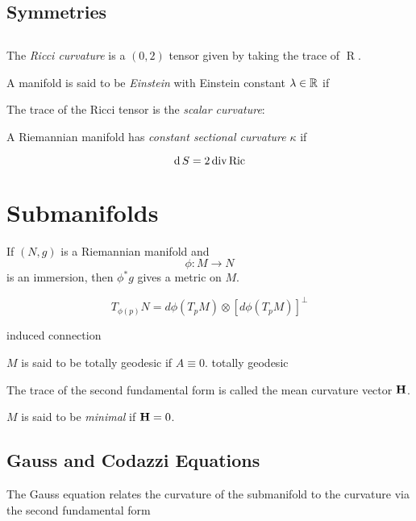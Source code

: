 \subsection{Symmetries}


\subsection{}
The \textit{Ricci curvature} is a $(0,2)$ tensor given by taking the trace of $\operatorname{R}$.
\begin{definition}
    
\end{definition}
A manifold is said to be \textit{Einstein} with Einstein constant $\lambda\in\mathbb{R}$ if 

The trace of the Ricci tensor is the \textit{scalar curvature}:
\begin{definition}
    
\end{definition}

\begin{definition}
    
\end{definition}
A Riemannian manifold has \textit{constant sectional curvature} $\kappa$ if 

\begin{lemma}
    \begin{equation}
        \operatorname{\mathrm{d}}{S}=2\operatorname{div}\operatorname{Ric}
    \end{equation}
\end{lemma}

\section{Submanifolds}

If $(N,g)$ is a Riemannian manifold and 
\[\phi:M\to N \] 
is an immersion, then $\phi^*g$ gives a metric on $M$.

\[ T_{\phi(p)}N=d\phi(T_pM)\otimes [d\phi(T_pM)]^\bot \]

induced connection

\begin{definition}
    
\end{definition}
$M$ is said to be totally geodesic if $A\equiv 0$.
totally geodesic

\begin{definition}
    The trace of the second fundamental form is called the mean curvature vector $\mathbf{H}$.
\end{definition}
$M$ is said to be \textit{minimal} if $\mathbf{H}=0$.

\subsection{Gauss and Codazzi Equations}
The Gauss equation relates the curvature of the submanifold to the curvature via the second fundamental form 
\begin{theorem}
    
\end{theorem}

\begin{theorem}
    
\end{theorem}